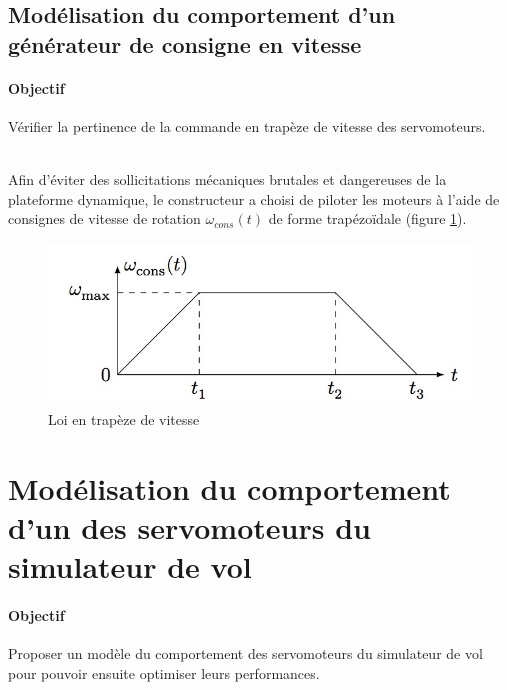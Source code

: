 \subsection{Modélisation du comportement d'un générateur de consigne en vitesse}

\paragraph{Objectif}

Vérifier la pertinence de la commande en trapèze de vitesse des servomoteurs. \\ ~\

Afin d'éviter des sollicitations mécaniques brutales et dangereuses de la plateforme dynamique, le constructeur a choisi de piloter les moteurs à l'aide de consignes de vitesse de rotation $\omega_{cons}(t)$ de forme trapézoïdale (figure \ref{img11}).

\begin{figure}[!h]
 \centering\includegraphics[width=0.7\linewidth]{img/figure_11}
 \caption{Loi en trapèze de vitesse}
 \label{img11}
\end{figure}


\section{Modélisation du comportement d'un des servomoteurs du simulateur de vol}

\paragraph{Objectif} Proposer un modèle du comportement des servomoteurs du simulateur de vol pour pouvoir ensuite optimiser leurs performances. \\ ~\

